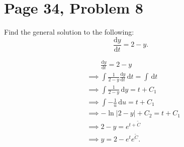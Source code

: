 \documentclass[11pt, letterpaper]{report}
\begin{document}
\section*{Page 34, Problem 8}
Find the general solution to the following:
\[
	\frac{\mathrm{d}y}{\mathrm{d}t} =2-y
.\]
\begin{solution}
	\begin{align*}
		&\qquad \frac{\mathrm{d}y}{\mathrm{d}t} =2-y\\
		&\implies \int \frac{1}{2-y}\frac{\mathrm{d}y}{\mathrm{d}t}  \,\mathrm{d} t=\int  \,\mathrm{d} t\\
		&\implies \int \frac{1}{2-y} \,\mathrm{d} y=t+C_1\\
		&\implies \int -\frac{1}{u} \,\mathrm{d} u=t+C_1\\
		&\implies-\ln \left| 2-y \right| +C_2=t+C_1\\
		&\implies2-y=e^{t+\tilde{C}}\\
		&\implies y=2-e^{t}e^{\tilde{C}}.
	\end{align*}
\end{solution}
\end{document}
